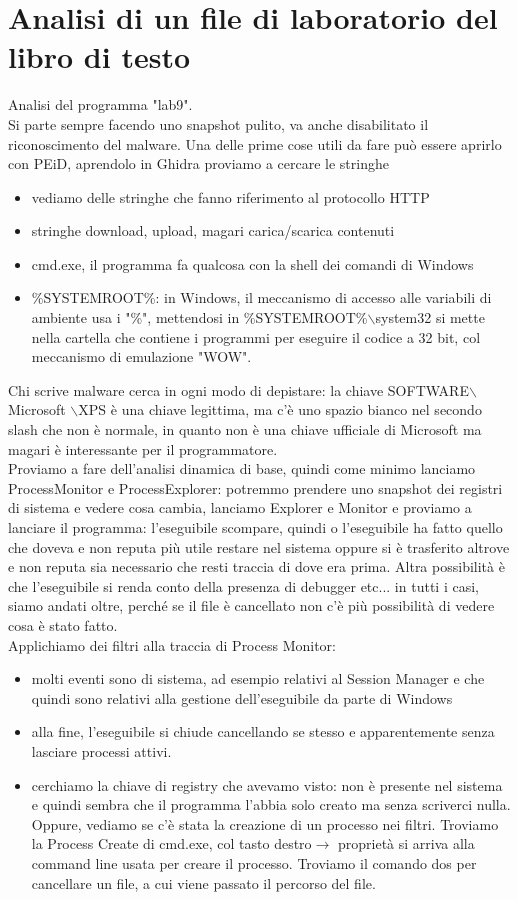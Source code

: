 \documentclass[12pt, oneside]{extbook}
\begin{document}
\section{Analisi di un file di laboratorio del libro di testo}
Analisi del programma "lab9".\\Si parte sempre facendo uno snapshot pulito, va anche disabilitato il riconoscimento del malware. Una delle prime cose utili da fare può essere aprirlo con PEiD, aprendolo in Ghidra proviamo a cercare le stringhe
\begin{itemize}
\item vediamo delle stringhe che fanno riferimento al protocollo HTTP
\item stringhe download, upload, magari carica/scarica contenuti
\item cmd.exe, il programma fa qualcosa con la shell dei comandi di Windows
\item \%SYSTEMROOT\%: in Windows, il meccanismo di accesso alle variabili di ambiente usa i "\%", mettendosi in \%SYSTEMROOT\%$\backslash$system32 si mette nella cartella che contiene i programmi per eseguire il codice a 32 bit, col meccanismo di emulazione "WOW".
\end{itemize}
Chi scrive malware cerca in ogni modo di depistare: la chiave SOFTWARE$\backslash$Microsoft $\backslash$XPS è una chiave legittima, ma c'è uno spazio bianco nel secondo slash che non è normale, in quanto non è una chiave ufficiale di Microsoft ma magari è interessante per il programmatore.\\ Proviamo a fare dell'analisi dinamica di base, quindi come minimo lanciamo ProcessMonitor e ProcessExplorer: potremmo prendere uno snapshot dei registri di sistema e vedere cosa cambia, lanciamo Explorer e Monitor e proviamo a lanciare il programma: l'eseguibile scompare, quindi o l'eseguibile ha fatto quello che doveva e non reputa più utile restare nel sistema oppure si è trasferito altrove e non reputa sia necessario che resti traccia di dove era prima. Altra possibilità è che l'eseguibile si renda conto della presenza di debugger etc... in tutti i casi, siamo andati oltre, perché se il file è cancellato non c'è più possibilità di vedere cosa è stato fatto.\\Applichiamo dei filtri alla traccia di Process Monitor:
\begin{itemize}
\item molti eventi sono di sistema, ad esempio relativi al Session Manager e che quindi sono relativi alla gestione dell'eseguibile da parte di Windows
\item alla fine, l'eseguibile si chiude cancellando se stesso e apparentemente senza lasciare processi attivi.
\item cerchiamo la chiave di registry che avevamo visto: non è presente nel sistema e quindi sembra che il programma l'abbia solo creato ma senza scriverci nulla. Oppure, vediamo se c'è stata la creazione di un processo nei filtri. Troviamo la Process Create di cmd.exe, col tasto destro$\rightarrow$ proprietà si arriva alla command line usata per creare il processo. Troviamo il comando dos per cancellare un file, a cui viene passato il percorso del file.
\end{itemize}
\end{document}
